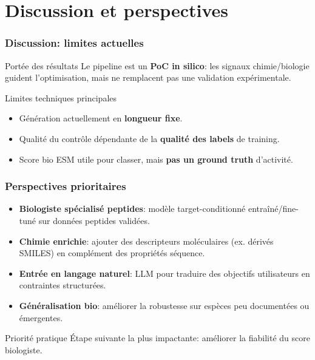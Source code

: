 \section{Discussion et perspectives}

\begin{frame}
    \frametitle{Discussion: limites actuelles}
    \begin{block}{Portée des résultats}
        \footnotesize
        Le pipeline est un \textbf{PoC in silico}: les signaux chimie/biologie guident l'optimisation, mais ne remplacent pas une validation expérimentale.
    \end{block}

    \begin{block}{Limites techniques principales}
        \footnotesize
        \begin{itemize}
            \item Génération actuellement en \textbf{longueur fixe}.
            \item Qualité du contrôle dépendante de la \textbf{qualité des labels} de training.
            \item Score bio ESM utile pour classer, mais \textbf{pas un ground truth} d'activité.
        \end{itemize}
    \end{block}
\end{frame}

\begin{frame}
    \frametitle{Perspectives prioritaires}
    \begin{itemize}
        \item \textbf{Biologiste spécialisé peptides}: modèle target-conditionné entraîné/fine-tuné sur données peptides validées.
        \item \textbf{Chimie enrichie}: ajouter des descripteurs moléculaires (ex. dérivés SMILES) en complément des propriétés séquence.
        \item \textbf{Entrée en langage naturel}: LLM pour traduire des objectifs utilisateurs en contraintes structurées.
        \item \textbf{Généralisation bio}: améliorer la robustesse sur espèces peu documentées ou émergentes.
    \end{itemize}

    \vspace{0.2em}
    \begin{block}{Priorité pratique}
        \footnotesize
        Étape suivante la plus impactante: améliorer la fiabilité du score biologiste.
    \end{block}
\end{frame}